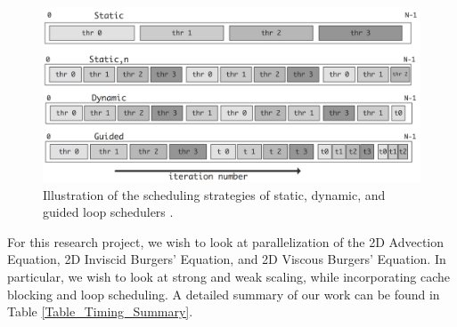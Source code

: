 \documentclass{article}
\begin{document}
\begin{figure}[h]
\centering
\includegraphics[width=1.0\textwidth]{Images/Loop_Schedule.png}
\caption{Illustration of the scheduling strategies of static, dynamic, and guided loop schedulers \cite{eijkhout_2021}.}
\label{Loop_Schedule}
\end{figure}

For this research project, we wish to look at parallelization of the 2D Advection Equation, 2D Inviscid Burgers' Equation, and 2D Viscous Burgers' Equation. In particular, we wish to look at strong and weak scaling, while incorporating cache blocking and loop scheduling. A detailed summary of our work can be found in Table \ref{Table_Timing_Summary}.
\end{document}
